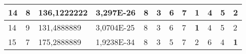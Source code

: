 \documentclass[conference]{IEEEtran}
\begin{document}
\begin{table*}[]
\begin{tabular}{|llll|llllllll|}
\multicolumn{1}{|l|}{14}                                                             & \multicolumn{1}{l|}{8}                                                                 & \multicolumn{1}{l|}{136,1222222}                                                           & 3,297E-26                               & \multicolumn{1}{l|}{8}                                                           & \multicolumn{1}{l|}{3}                                                           & \multicolumn{1}{l|}{6}                                                           & \multicolumn{1}{l|}{7}                                                           & \multicolumn{1}{l|}{\textbf{1}}                                                  & \multicolumn{1}{l|}{4}                                                           & \multicolumn{1}{l|}{5}                                                           & 2                                   \\ \hline
\multicolumn{1}{|l|}{14}                                                             & \multicolumn{1}{l|}{9}                                                                 & \multicolumn{1}{l|}{131,4888889}                                                           & 3,0704E-25                              & \multicolumn{1}{l|}{8}                                                           & \multicolumn{1}{l|}{3}                                                           & \multicolumn{1}{l|}{6}                                                           & \multicolumn{1}{l|}{7}                                                           & \multicolumn{1}{l|}{\textbf{1}}                                                  & \multicolumn{1}{l|}{4}                                                           & \multicolumn{1}{l|}{5}                                                           & 2                                   \\ \hline
\multicolumn{1}{|l|}{15}                                                             & \multicolumn{1}{l|}{7}                                                                 & \multicolumn{1}{l|}{175,2888889}                                                           & 1,9238E-34                              & \multicolumn{1}{l|}{8}                                                           & \multicolumn{1}{l|}{3}                                                           & \multicolumn{1}{l|}{5}                                                           & \multicolumn{1}{l|}{7}                                                           & \multicolumn{1}{l|}{2}                                                           & \multicolumn{1}{l|}{6}                                                           & \multicolumn{1}{l|}{4}                                                           & \textbf{1}                          \\ \hline

\end{tabular}
\end{table*}
\end{document}
